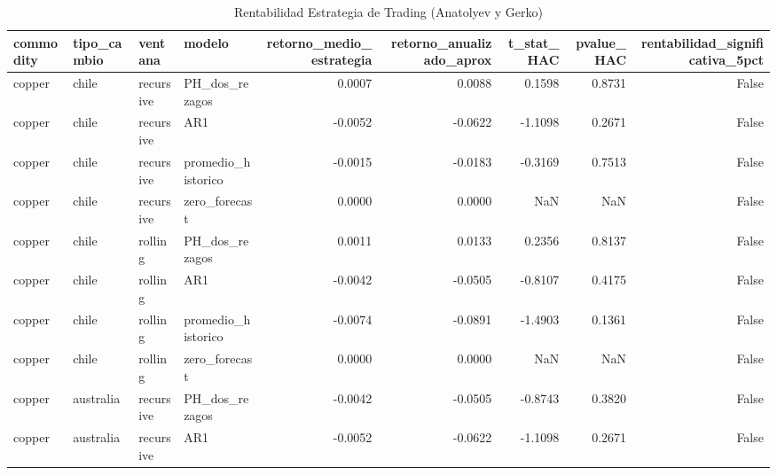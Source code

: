 \begin{table}
\caption{Rentabilidad Estrategia de Trading (Anatolyev y Gerko)}
\label{tab:trading}
\begin{tabular}{llllrrrrr}
\toprule
commodity & tipo_cambio & ventana & modelo & retorno_medio_estrategia & retorno_anualizado_aprox & t_stat_HAC & pvalue_HAC & rentabilidad_significativa_5pct \\
\midrule
copper & chile & recursive & PH_dos_rezagos & 0.0007 & 0.0088 & 0.1598 & 0.8731 & False \\
copper & chile & recursive & AR1 & -0.0052 & -0.0622 & -1.1098 & 0.2671 & False \\
copper & chile & recursive & promedio_historico & -0.0015 & -0.0183 & -0.3169 & 0.7513 & False \\
copper & chile & recursive & zero_forecast & 0.0000 & 0.0000 & NaN & NaN & False \\
copper & chile & rolling & PH_dos_rezagos & 0.0011 & 0.0133 & 0.2356 & 0.8137 & False \\
copper & chile & rolling & AR1 & -0.0042 & -0.0505 & -0.8107 & 0.4175 & False \\
copper & chile & rolling & promedio_historico & -0.0074 & -0.0891 & -1.4903 & 0.1361 & False \\
copper & chile & rolling & zero_forecast & 0.0000 & 0.0000 & NaN & NaN & False \\
copper & australia & recursive & PH_dos_rezagos & -0.0042 & -0.0505 & -0.8743 & 0.3820 & False \\
copper & australia & recursive & AR1 & -0.0052 & -0.0622 & -1.1098 & 0.2671 & False \\
\bottomrule
\end{tabular}
\end{table}
